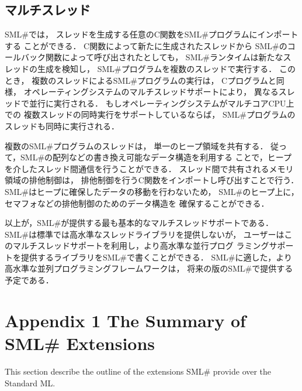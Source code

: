 \documentclass{jbook}
\newif\ifjp
\newcommand{\txt}[2]{#2}
\newcommand{\smlsharp}{SML\#}
\begin{document}
\section{マルチスレッド}

	\smlsharp{}では，
スレッドを生成する任意のC関数を\smlsharp{}プログラムにインポートする
ことができる．
	C関数によって新たに生成されたスレッドから
\smlsharp{}のコールバック関数によって呼び出されたとしても，
\smlsharp{}ランタイムは新たなスレッドの生成を検知し，
\smlsharp{}プログラムを複数のスレッドで実行する．
	このとき，
複数のスレッドによる\smlsharp{}プログラムの実行は，
Cプログラムと同様，
オペレーティングシステムのマルチスレッドサポートにより，
異なるスレッドで並行に実行される．
	もしオペレーティングシステムがマルチコアCPU上での
複数スレッドの同時実行をサポートしているならば，
\smlsharp{}プログラムのスレッドも同時に実行される．

	複数の\smlsharp{}プログラムのスレッドは，
単一のヒープ領域を共有する．
	従って，\smlsharp{}の配列などの書き換え可能なデータ構造を利用する
ことで，ヒープを介したスレッド間通信を行うことができる．
	スレッド間で共有されるメモリ領域の排他制御は，
排他制御を行うC関数をインポートし呼び出すことで行う．
	\smlsharp{}はヒープに確保したデータの移動を行わないため，
\smlsharp{}のヒープ上に，セマフォなどの排他制御のためのデータ構造を
確保することができる．

	以上が，\smlsharp{}が提供する最も基本的なマルチスレッドサポートである．
	\smlsharp{}は標準では高水準なスレッドライブラリを提供しないが，
ユーザーはこのマルチスレッドサポートを利用し，より高水準な並行プログ
ラミングサポートを提供するライブラリを\smlsharp{}で書くことができる．
	\smlsharp{}に適した，より高水準な並列プログラミングフレームワークは，
将来の版の\smlsharp{}で提供する予定である．

% 
\ifjp%
\else%
\fi%

\chapter{\txt{付録１ \smlsharp{}の拡張概要}{Appendix 1 The Summary of \smlsharp{} Extensions}}
\ifjp%
	本節では，Standard MLに習熟した読者のために，\smlsharp{}が提供す
る拡張の概要を記述する．
\else%
	This section describe the outline of the extensions \smlsharp{}
provide over the Standard ML.
\fi%
\end{document}
